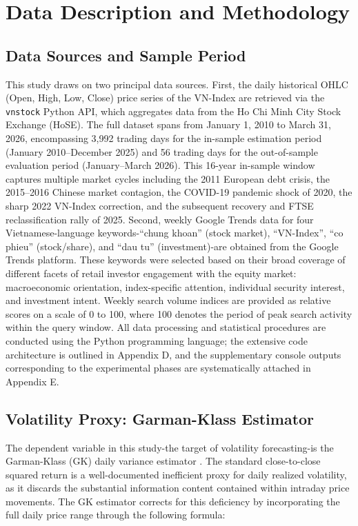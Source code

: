\documentclass[12pt, a4paper]{article}
\begin{document}
\section{Data Description and Methodology}

\subsection{Data Sources and Sample Period}

This study draws on two principal data sources. First, the daily historical OHLC (Open, High, Low, Close) price series of the VN-Index are retrieved via the \texttt{vnstock} Python API, which aggregates data from the Ho Chi Minh City Stock Exchange (HoSE). The full dataset spans from January 1, 2010 to March 31, 2026, encompassing 3,992 trading days for the in-sample estimation period (January 2010--December 2025) and 56 trading days for the out-of-sample evaluation period (January--March 2026). This 16-year in-sample window captures multiple market cycles including the 2011 European debt crisis, the 2015--2016 Chinese market contagion, the COVID-19 pandemic shock of 2020, the sharp 2022 VN-Index correction, and the subsequent recovery and FTSE reclassification rally of 2025. Second, weekly Google Trends data for four Vietnamese-language keywords-``chung khoan'' (stock market), ``VN-Index'', ``co phieu'' (stock/share), and ``dau tu'' (investment)-are obtained from the Google Trends platform. These keywords were selected based on their broad coverage of different facets of retail investor engagement with the equity market: macroeconomic orientation, index-specific attention, individual security interest, and investment intent. Weekly search volume indices are provided as relative scores on a scale of 0 to 100, where 100 denotes the period of peak search activity within the query window. All data processing and statistical procedures are conducted using the Python programming language; the extensive code architecture is outlined in Appendix D, and the supplementary console outputs corresponding to the experimental phases are systematically attached in Appendix E.

\subsection{Volatility Proxy: Garman-Klass Estimator}

The dependent variable in this study-the target of volatility forecasting-is the Garman-Klass (GK) daily variance estimator \citep{garman1980}. The standard close-to-close squared return is a well-documented inefficient proxy for daily realized volatility, as it discards the substantial information content contained within intraday price movements. The GK estimator corrects for this deficiency by incorporating the full daily price range through the following formula:
\end{document}
